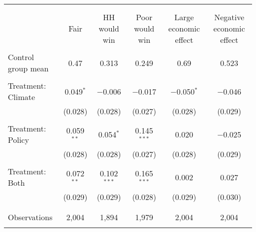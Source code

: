 
\begin{tabular}{@{\extracolsep{5pt}}lccccc} 
\\[-1.8ex]\hline 
\hline \\[-1.8ex] 
\\[-1.8ex] & Fair & HH would win & Poor would win & Large economic effect & Negative economic effect \\ 
\hline \\[-1.8ex] 
 Control group mean & 0.47 & 0.313 & 0.249 & 0.69 & 0.523  \\ \hline \\[-1.8ex] Treatment: Climate & 0.049$^{*}$ & $-$0.006 & $-$0.017 & $-$0.050$^{*}$ & $-$0.046 \\ 
  & (0.028) & (0.028) & (0.027) & (0.028) & (0.029) \\ 
  & & & & & \\ 
 Treatment: Policy & 0.059$^{**}$ & 0.054$^{*}$ & 0.145$^{***}$ & 0.020 & $-$0.025 \\ 
  & (0.028) & (0.028) & (0.027) & (0.028) & (0.029) \\ 
  & & & & & \\ 
 Treatment: Both & 0.072$^{**}$ & 0.102$^{***}$ & 0.165$^{***}$ & 0.002 & 0.027 \\ 
  & (0.029) & (0.029) & (0.028) & (0.029) & (0.030) \\ 
  & & & & & \\ 
\hline \\[-1.8ex] 

Observations & 2,004 & 1,894 & 1,979 & 2,004 & 2,004 \\ 
\hline 
\hline \\[-1.8ex] 
\end{tabular} 